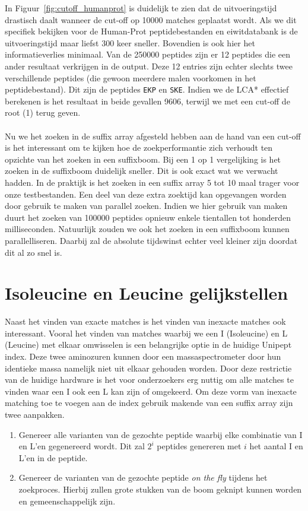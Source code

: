 In Figuur~\ref{fig:cutoff_humanprot} is duidelijk te zien dat de uitvoeringstijd drastisch daalt wanneer de cut-off op 10000 matches geplaatst wordt.
Als we dit specifiek bekijken voor de Human-Prot peptidebestanden en eiwitdatabank is de uitvoeringstijd maar liefst 300 keer sneller.
Bovendien is ook hier het informatieverlies minimaal.
Van de 250000 peptides zijn er 12 peptides die een ander resultaat verkrijgen in de output.
Deze 12 entries zijn echter slechts twee verschillende peptides (die gewoon meerdere malen voorkomen in het peptidebestand).
Dit zijn de peptides \texttt{EKP} en \texttt{SKE}.
Indien we de LCA* effectief berekenen is het resultaat in beide gevallen 9606, terwijl we met een cut-off de root (1) terug geven.
\\ \\
Nu we het zoeken in de suffix array afgesteld hebben aan de hand van een cut-off is het interessant om te kijken hoe de zoekperformantie zich verhoudt ten opzichte van het zoeken in een suffixboom.
Bij een 1 op 1 vergelijking is het zoeken in de suffixboom duidelijk sneller.
Dit is ook exact wat we verwacht hadden.
In de praktijk is het zoeken in een suffix array 5 tot 10 maal trager voor onze testbestanden.
Een deel van deze extra zoektijd kan opgevangen worden door gebruik te maken van parallel zoeken.
Indien we hier gebruik van maken duurt het zoeken van 100000 peptides opnieuw enkele tientallen tot honderden milliseconden.
Natuurlijk zouden we ook het zoeken in een suffixboom kunnen parallelliseren.
Daarbij zal de absolute tijdswinst echter veel kleiner zijn doordat dit al zo snel is.

\section{Isoleucine en Leucine gelijkstellen}\label{sec:isoleucine-en-leucine-equivalentie}
Naast het vinden van exacte matches is het vinden van inexacte matches ook interessant.
Vooral het vinden van matches waarbij we een I (Isoleucine) en L (Leucine) met elkaar omwisselen is een belangrijke optie in de huidige Unipept index.
Deze twee aminozuren kunnen door een massaspectrometer door hun identieke massa namelijk niet uit elkaar gehouden worden.
Door deze restrictie van de huidige hardware is het voor onderzoekers erg nuttig om alle matches te vinden waar een I ook een L kan zijn of omgekeerd.
Om deze vorm van inexacte matching toe te voegen aan de index gebruik makende van een suffix array zijn twee aanpakken.
\begin{enumerate}
    \item Genereer alle varianten van de gezochte peptide waarbij elke combinatie van I en L'en gegenereerd wordt.
    Dit zal $2^i$ peptides genereren met $i$ het aantal I en L'en in de peptide.
    \item Genereer de varianten van de gezochte peptide \textit{on the fly} tijdens het zoekproces.
    Hierbij zullen grote stukken van de boom geknipt kunnen worden en gemeenschappelijk zijn.
\end{enumerate}

